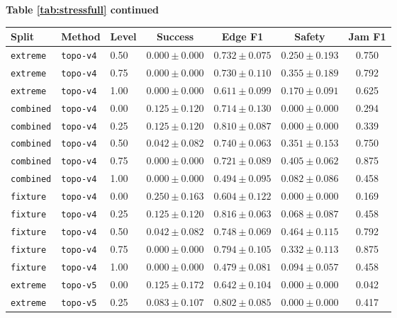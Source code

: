 \documentclass{article}
\begin{document}
\begin{center}
\textbf{Table \ref{tab:stressfull} continued}\\[0.4ex]
\begin{tabular}{lllcccc}
\toprule
Split & Method & Level & Success & Edge F1 & Safety & Jam F1 \\
\midrule
\texttt{extreme} & \texttt{topo-v4} & 0.50 & $0.000 \pm 0.000$ & $0.732 \pm 0.075$ & $0.250 \pm 0.193$ & 0.750 \\
\texttt{extreme} & \texttt{topo-v4} & 0.75 & $0.000 \pm 0.000$ & $0.730 \pm 0.110$ & $0.355 \pm 0.189$ & 0.792 \\
\texttt{extreme} & \texttt{topo-v4} & 1.00 & $0.000 \pm 0.000$ & $0.611 \pm 0.099$ & $0.170 \pm 0.091$ & 0.625 \\
\texttt{combined} & \texttt{topo-v4} & 0.00 & $0.125 \pm 0.120$ & $0.714 \pm 0.130$ & $0.000 \pm 0.000$ & 0.294 \\
\texttt{combined} & \texttt{topo-v4} & 0.25 & $0.125 \pm 0.120$ & $0.810 \pm 0.087$ & $0.000 \pm 0.000$ & 0.339 \\
\texttt{combined} & \texttt{topo-v4} & 0.50 & $0.042 \pm 0.082$ & $0.740 \pm 0.063$ & $0.351 \pm 0.153$ & 0.750 \\
\texttt{combined} & \texttt{topo-v4} & 0.75 & $0.000 \pm 0.000$ & $0.721 \pm 0.089$ & $0.405 \pm 0.062$ & 0.875 \\
\texttt{combined} & \texttt{topo-v4} & 1.00 & $0.000 \pm 0.000$ & $0.494 \pm 0.095$ & $0.082 \pm 0.086$ & 0.458 \\
\texttt{fixture} & \texttt{topo-v4} & 0.00 & $0.250 \pm 0.163$ & $0.604 \pm 0.122$ & $0.000 \pm 0.000$ & 0.169 \\
\texttt{fixture} & \texttt{topo-v4} & 0.25 & $0.125 \pm 0.120$ & $0.816 \pm 0.063$ & $0.068 \pm 0.087$ & 0.458 \\
\texttt{fixture} & \texttt{topo-v4} & 0.50 & $0.042 \pm 0.082$ & $0.748 \pm 0.069$ & $0.464 \pm 0.115$ & 0.792 \\
\texttt{fixture} & \texttt{topo-v4} & 0.75 & $0.000 \pm 0.000$ & $0.794 \pm 0.105$ & $0.332 \pm 0.113$ & 0.875 \\
\texttt{fixture} & \texttt{topo-v4} & 1.00 & $0.000 \pm 0.000$ & $0.479 \pm 0.081$ & $0.094 \pm 0.057$ & 0.458 \\
\texttt{extreme} & \texttt{topo-v5} & 0.00 & $0.125 \pm 0.172$ & $0.642 \pm 0.104$ & $0.000 \pm 0.000$ & 0.042 \\
\texttt{extreme} & \texttt{topo-v5} & 0.25 & $0.083 \pm 0.107$ & $0.802 \pm 0.085$ & $0.000 \pm 0.000$ & 0.417 \\

\end{tabular}
\end{center}
\end{document}
